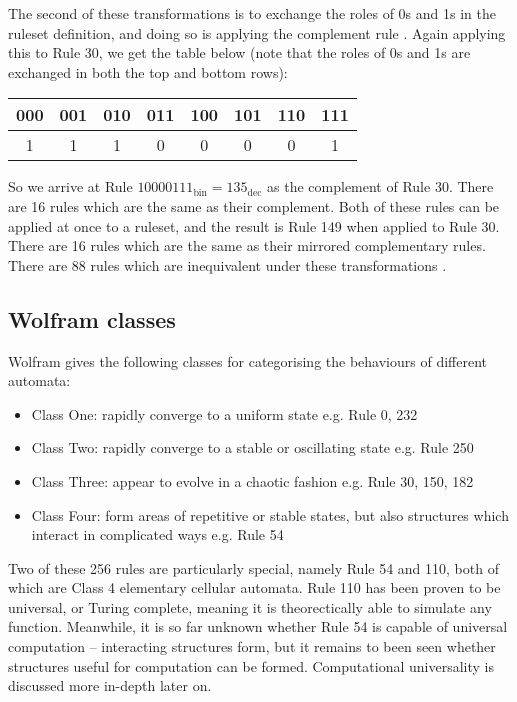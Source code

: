 \documentclass[11pt,a4paper]{article}
\begin{document}
    The second of these transformations is to exchange the roles of 0s and 1s in
    the ruleset definition, and doing so is applying the complement rule
    \cite{elementary}.  Again applying this to Rule 30, we get the table below
    (note that the roles of 0s and 1s are exchanged in both the top and bottom
    rows):

    \begin{table}[h]
        \centering
        \begin{tabular}{|c|c|c|c|c|c|c|c|}\hline
            000 & 001 & 010 & 011 & 100 & 101 & 110 & 111   \\
            \hline
            1 & 1 & 1 & 0 & 0 & 0 & 0 & 1   \\
            \hline
        \end{tabular}
    \end{table}

    So we arrive at Rule $10000111_{\text{bin}} = 135_{\text{dec}}$ as the
    complement of Rule 30. There are 16 rules which are the same as their
    complement.
    Both of these rules can be applied at once to a ruleset, and the result is
    Rule 149 when applied to Rule 30. There are 16 rules which are the same as
    their mirrored complementary rules. There are 88 rules which are
    inequivalent under these transformations \cite{elementary}.

    \subsection{Wolfram classes}
    Wolfram gives the following classes for categorising the behaviours of
    different automata:

    \begin{itemize}
        \item Class One: rapidly converge to a uniform state e.g. Rule 0, 232
        \item Class Two: rapidly converge to a stable or oscillating state e.g.
            Rule 250
        \item Class Three: appear to evolve in a chaotic fashion e.g. Rule 30,
            150, 182
        \item Class Four: form areas of repetitive or stable states, but also
            structures which interact in complicated ways e.g. Rule 54
    \end{itemize}

    Two of these 256 rules are particularly special, namely Rule 54 and 110,
    both of which are Class 4 elementary cellular automata. Rule 110 has been
    proven to be universal, or Turing complete, meaning it is theorectically
    able to simulate any function. Meanwhile, it is so far unknown whether Rule
    54 is capable of universal computation -- interacting structures form, but
    it remains to been seen whether structures useful for computation can be
    formed. Computational universality is discussed more in-depth later on.
\end{document}
